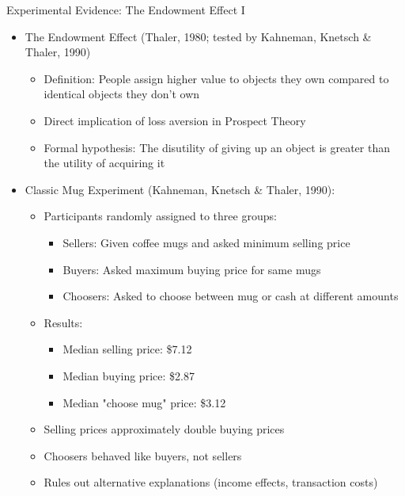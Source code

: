 \documentclass[10pt,handout]{beamer}
\begin{document}
\begin{frame}{Experimental Evidence: The Endowment Effect I}
  \begin{itemize}[<+->]
    \item The Endowment Effect (Thaler, 1980; tested by Kahneman, Knetsch \& Thaler, 1990)
      \begin{itemize}
        \item Definition: People assign higher value to objects they own compared to identical objects they don't own
        \item Direct implication of loss aversion in Prospect Theory
        \item Formal hypothesis: The disutility of giving up an object is greater than the utility of acquiring it
      \end{itemize}
    \item Classic Mug Experiment (Kahneman, Knetsch \& Thaler, 1990):
      \begin{itemize}
        \item Participants randomly assigned to three groups:
          \begin{itemize}
            \item Sellers: Given coffee mugs and asked minimum selling price
            \item Buyers: Asked maximum buying price for same mugs
            \item Choosers: Asked to choose between mug or cash at different amounts
          \end{itemize}
        \item Results:
          \begin{itemize}
            \item Median selling price: \$7.12
            \item Median buying price: \$2.87
            \item Median "choose mug" price: \$3.12
          \end{itemize}
        \item Selling prices approximately double buying prices
        \item Choosers behaved like buyers, not sellers
        \item Rules out alternative explanations (income effects, transaction costs)
      \end{itemize}
  \end{itemize}
\end{frame}
\end{document}
